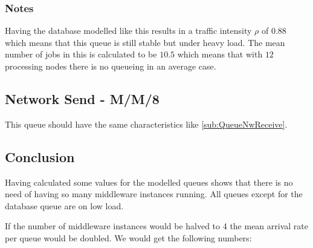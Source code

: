 \documentclass[a4paper]{article}
\begin{document}

\subsubsection{Notes}
Having the database modelled like this results in a traffic intensity $\rho$ of $0.88$ which means that this queue is still stable but under heavy load. The mean number of jobs in this is calculated to be $10.5$ which means that with $12$ processing nodes there is no queueing in an average case.


\subsection{Network Send - M/M/8}
This queue should have the same characteristics like \ref{sub:QueueNwReceive}.


\subsection{Conclusion}

Having calculated some values for the modelled queues shows that there is no need of having so many middleware instances running. All queues except for the database queue are on low load.

If the number of middleware instances would be halved to 4 the mean arrival rate per queue would be doubled. We would get the following numbers:
\end{document}
